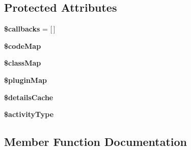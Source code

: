 \subsection*{Protected Attributes}
\begin{DoxyCompactItemize}
\item 
\hypertarget{classDMA_1_1Friends_1_1Classes_1_1ActivityManager_a8cadb8848f604623c0697bd12612c47c}{}{\bfseries \$callbacks} = \mbox{[}$\,$\mbox{]}\label{classDMA_1_1Friends_1_1Classes_1_1ActivityManager_a8cadb8848f604623c0697bd12612c47c}

\item 
\hypertarget{classDMA_1_1Friends_1_1Classes_1_1ActivityManager_a7256bfe22c687cadeb4283f87156f811}{}{\bfseries \$code\+Map}\label{classDMA_1_1Friends_1_1Classes_1_1ActivityManager_a7256bfe22c687cadeb4283f87156f811}

\item 
\hypertarget{classDMA_1_1Friends_1_1Classes_1_1ActivityManager_af13b2bd6d9a49fe21f89b98df06e09b4}{}{\bfseries \$class\+Map}\label{classDMA_1_1Friends_1_1Classes_1_1ActivityManager_af13b2bd6d9a49fe21f89b98df06e09b4}

\item 
\hypertarget{classDMA_1_1Friends_1_1Classes_1_1ActivityManager_a1158b100754d3c79869279d9714a0ea2}{}{\bfseries \$plugin\+Map}\label{classDMA_1_1Friends_1_1Classes_1_1ActivityManager_a1158b100754d3c79869279d9714a0ea2}

\item 
\hypertarget{classDMA_1_1Friends_1_1Classes_1_1ActivityManager_a38859bff70496b4a982f8231e7eba5e0}{}{\bfseries \$details\+Cache}\label{classDMA_1_1Friends_1_1Classes_1_1ActivityManager_a38859bff70496b4a982f8231e7eba5e0}

\item 
\hypertarget{classDMA_1_1Friends_1_1Classes_1_1ActivityManager_aa2b78ca57a517b261da6f579d16c3f94}{}{\bfseries \$activity\+Type}\label{classDMA_1_1Friends_1_1Classes_1_1ActivityManager_aa2b78ca57a517b261da6f579d16c3f94}

\end{DoxyCompactItemize}


\subsection{Member Function Documentation}
\hypertarget{classDMA_1_1Friends_1_1Classes_1_1ActivityManager_abc447da5d00e01596fbfb3758c36b3de}{}
